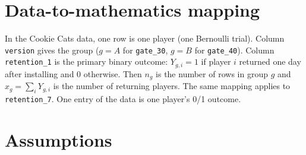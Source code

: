 \documentclass[11pt]{article}
\begin{document}
\section{Data-to-mathematics mapping}
In the Cookie Cats data, one row is one player (one Bernoulli trial). Column \texttt{version} gives the group ($g=A$ for \texttt{gate\_30}, $g=B$ for \texttt{gate\_40}). Column \texttt{retention\_1} is the primary binary outcome: $Y_{g,i}=1$ if player $i$ returned one day after installing and $0$ otherwise. Then $n_g$ is the number of rows in group $g$ and $x_g=\sum_iY_{g,i}$ is the number of returning players. The same mapping applies to \texttt{retention\_7}. One entry of the data is one player's 0/1 outcome.

\section{Assumptions}
\end{document}
